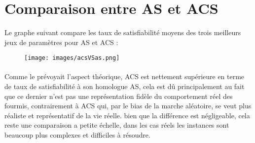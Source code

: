 \begin{table}[H]
	\centering
		\caption{Meilleurs jeux de paramètres pour l'ensemble des instances choisies (AS)}
\end{table}

\section{Comparaison entre AS et ACS}
\paragraph{}
Le graphe suivant compare les taux de satisfiabilité moyens des trois meilleurs jeux de paramètres pour AS et ACS : \\

\begin{figure}[H]
	\texttt{[image: images/acsVSas.png]}
\end{figure}

\paragraph{}
Comme le prévoyait l'aspect théorique, ACS est nettement supérieure en terme de taux de satisfiabilité à son homologue AS, cela est dû principalement au fait que ce dernier n'est pas une représentation fidèle  du comportement réel des fourmis, contrairement à ACS qui, par le bias de la marche aléatoire, se veut plus réaliste et représentatif de la vie réelle. bien que la différence est négligeable, cela reste une comparaison a petite échelle, dans les cas réels les instances sont beaucoup plus complexes et difficiles à résoudre.
